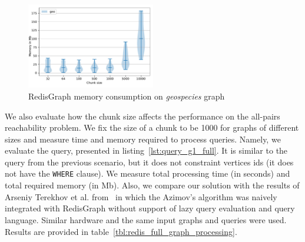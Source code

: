 \begin{figure}[h]
\centering
\includegraphics[width=0.5\textwidth]{data/raw_memory/geospecies.pdf}
\caption{RedisGraph memory consumption on \textit{geospecies} graph}
\label{fig:redis_memory_geospecies}
\end{figure}


\begin{algorithm}
\end{algorithm}

We also evaluate how the chunk size affects the performance on the all-pairs reachability problem.
We fix the size of a chunk to be 1000 for graphs of different sizes and measure time and memory required to process queries.
Namely, we evaluate the query, presented in listing~\ref{lst:query_g1_full}.
It is similar to the query from the previous scenario, but it does not constraint  vertices ids (it does not have the \texttt{WHERE} clause).
We measure total processing time (in seconds) and total required memory (in Mb).
Also, we compare our solution with the results of Arseniy Terekhov et al. from~\cite{10.1145/3398682.3399163} in which the Azimov's algorithm was naively integrated with RedisGraph without support of lazy query evaluation and query language.
Similar hardware and the same input graphs and queries were used.
Results are provided in table~\ref{tbl:redis_full_graph_processing}.

